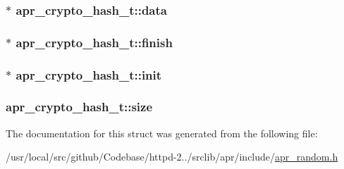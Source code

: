 \subsubsection[{\texorpdfstring{data}{data}}]{$\ast$ apr\+\_\+crypto\+\_\+hash\+\_\+t\+::data}\hypertarget{structapr__crypto__hash__t_a0211f5be5ddce65dee1ea0720d39e8e3}{}\label{structapr__crypto__hash__t_a0211f5be5ddce65dee1ea0720d39e8e3}
\subsubsection[{\texorpdfstring{finish}{finish}}]{$\ast$ apr\+\_\+crypto\+\_\+hash\+\_\+t\+::finish}\hypertarget{structapr__crypto__hash__t_abd6933f64b61c595788ddf0f16d5b48c}{}\label{structapr__crypto__hash__t_abd6933f64b61c595788ddf0f16d5b48c}
\subsubsection[{\texorpdfstring{init}{init}}]{$\ast$ apr\+\_\+crypto\+\_\+hash\+\_\+t\+::init}\hypertarget{structapr__crypto__hash__t_a3b0a8b85bc2207235024a9e64febab69}{}\label{structapr__crypto__hash__t_a3b0a8b85bc2207235024a9e64febab69}
\subsubsection[{\texorpdfstring{size}{size}}]{ apr\+\_\+crypto\+\_\+hash\+\_\+t\+::size}\hypertarget{structapr__crypto__hash__t_ade59f47b349e3a9eef98097fb87fbf72}{}\label{structapr__crypto__hash__t_ade59f47b349e3a9eef98097fb87fbf72}


The documentation for this struct was generated from the following file\+:\begin{DoxyCompactItemize}
\item 
/usr/local/src/github/\+Codebase/httpd-\/2../srclib/apr/include/\hyperlink{apr__random_8h}{apr\+\_\+random.\+h}\end{DoxyCompactItemize}
